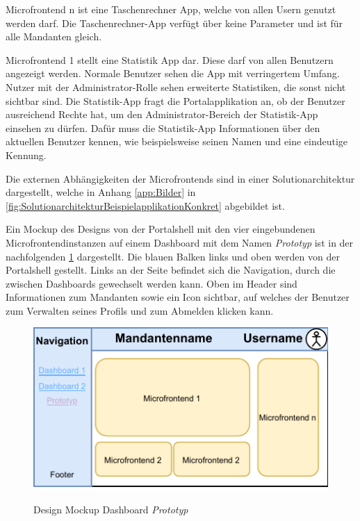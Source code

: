 Microfrontend n ist eine Taschenrechner App, welche von allen Usern genutzt werden darf. Die Taschenrechner-App verfügt über keine Parameter und ist für alle Mandanten gleich.

Microfrontend 1 stellt eine Statistik App dar. Diese darf von allen Benutzern angezeigt werden. Normale Benutzer sehen die App mit verringertem Umfang. Nutzer mit der Administrator-Rolle sehen erweiterte Statistiken, die sonst nicht sichtbar sind. Die Statistik-App fragt die Portalapplikation an, ob der Benutzer ausreichend Rechte hat, um den Administrator-Bereich der Statistik-App einsehen zu dürfen. Dafür muss die Statistik-App Informationen über den aktuellen Benutzer kennen, wie beispielsweise seinen Namen und eine eindeutige Kennung.

Die externen Abhängigkeiten der Microfrontends sind in einer Solutionarchitektur  dargestellt, welche in Anhang \ref{app:Bilder} in \cref{fig:SolutionarchitekturBeispielapplikationKonkret} abgebildet ist.

Ein Mockup des Designs von der Portalshell mit den vier eingebundenen Microfrontendinstanzen auf einem Dashboard mit dem Namen \textit{Prototyp} ist in der nachfolgenden \cref{fig:MockupBeispiel} dargestellt. Die blauen Balken links und oben werden von der Portalshell gestellt. Links an der Seite befindet sich die Navigation, durch die zwischen Dashboards gewechselt werden kann. Oben im Header sind Informationen zum Mandanten sowie ein Icon sichtbar, auf welches der Benutzer zum Verwalten seines Profils und zum Abmelden klicken kann.

\begin{figure}[hbt!]
	\centering
	\begin{minipage}[t]{0.7\textwidth}	
		\caption{Design Mockup Dashboard \textit{Prototyp}}
		\includegraphics[width=1\textwidth]{img/MockupBeispiel}\\ %
		\label{fig:MockupBeispiel}
	\end{minipage}
\end{figure}

